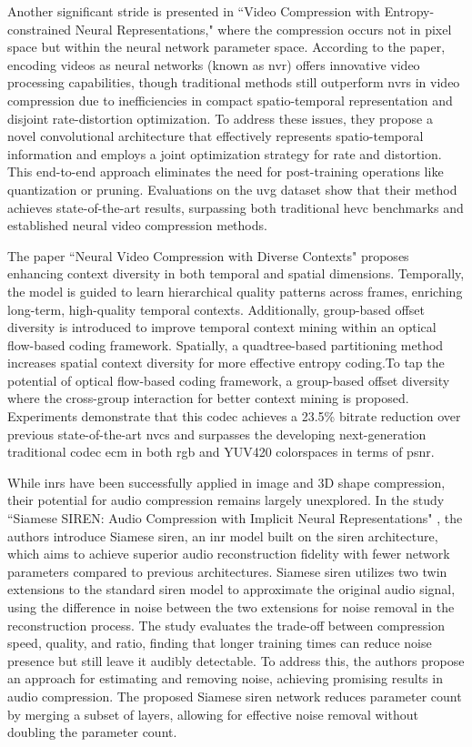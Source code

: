 Another significant stride is presented in ``Video Compression with Entropy-constrained Neural Representations," \cite{Gomes_2023_CVPR} where the compression occurs not in pixel space but within the neural network parameter space. According to the paper, encoding videos as neural networks (known as \gls{nvr}) offers innovative video processing capabilities, though traditional methods still outperform \gls{nvr}s in video compression due to inefficiencies in compact spatio-temporal representation and disjoint rate-distortion optimization. To address these issues, they propose a novel convolutional architecture that effectively represents spatio-temporal information and employs a joint optimization strategy for rate and distortion. This end-to-end approach eliminates the need for post-training operations like quantization or pruning. Evaluations on the \gls{uvg} dataset show that their method achieves state-of-the-art results, surpassing both traditional \gls{hevc} benchmarks and established neural video compression methods. 

The paper ``Neural Video Compression with Diverse Contexts" \cite{li2023neural} proposes enhancing context diversity in both temporal and spatial dimensions. Temporally, the model is guided to learn hierarchical quality patterns across frames, enriching long-term, high-quality temporal contexts. Additionally, group-based offset diversity is introduced to improve temporal context mining within an optical flow-based coding framework. Spatially, a quadtree-based partitioning method increases spatial context diversity for more effective entropy coding.To tap the potential of optical flow-based coding framework, a group-based offset diversity where the cross-group interaction for better context mining is proposed. Experiments demonstrate that this \gls{codec} achieves a 23.5\% bitrate reduction over previous state-of-the-art \gls{nvc}s and surpasses the developing next-generation traditional \gls{codec} \gls{ecm} in both \gls{rgb} and YUV420 colorspaces in terms of \gls{psnr}. 

While \gls{inr}s have been successfully applied in image and 3D shape compression, their potential for audio compression remains largely unexplored. In the study ``Siamese SIREN: Audio Compression with Implicit Neural Representations" \cite{lanzendörfer2023siamese}, the authors introduce Siamese \gls{siren}, an \gls{inr} model built on the \gls{siren} architecture, which aims to achieve superior audio reconstruction fidelity with fewer network parameters compared to previous architectures. Siamese \gls{siren} utilizes two twin extensions to the standard \gls{siren} model to approximate the original audio signal, using the difference in noise between the two extensions for noise removal in the reconstruction process. The study evaluates the trade-off between compression speed, quality, and ratio, finding that longer training times can reduce noise presence but still leave it audibly detectable. To address this, the authors propose an approach for estimating and removing noise, achieving promising results in audio compression. The proposed Siamese \gls{siren} network reduces parameter count by merging a subset of layers, allowing for effective noise removal without doubling the parameter count.

